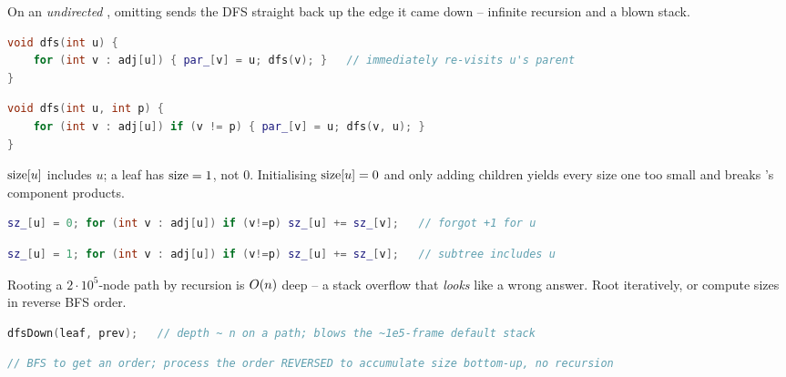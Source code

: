 \begin{warningbox}
On an \emph{undirected} , omitting  sends the DFS
straight back up the edge it came down -- infinite recursion and a blown stack.
\end{warningbox}
\begin{lstlisting}[caption={\textcolor{warningred}{WRONG}: walks back to the parent}, language=C++, basicstyle=\ttfamily\small]
void dfs(int u) {
    for (int v : adj[u]) { par_[v] = u; dfs(v); }   // immediately re-visits u's parent
}
\end{lstlisting}
\begin{lstlisting}[caption={\textcolor{successgreen}{RIGHT}: skip the node we came from}, language=C++, basicstyle=\ttfamily\small]
void dfs(int u, int p) {
    for (int v : adj[u]) if (v != p) { par_[v] = u; dfs(v, u); }
}
\end{lstlisting}

\begin{warningbox}
$\operatorname{size}[u]$ includes $u$; a leaf has $\operatorname{size}=1$, not $0$. Initialising $\operatorname{size}[u]=0$ and only
adding children yields every size one too small and breaks 's
component products.
\end{warningbox}
\begin{lstlisting}[caption={\textcolor{warningred}{WRONG}: leaf size 0, all sizes off by one}, language=C++, basicstyle=\ttfamily\small]
sz_[u] = 0; for (int v : adj[u]) if (v!=p) sz_[u] += sz_[v];   // forgot +1 for u
\end{lstlisting}
\begin{lstlisting}[caption={\textcolor{successgreen}{RIGHT}: start at 1 (count yourself)}, language=C++, basicstyle=\ttfamily\small]
sz_[u] = 1; for (int v : adj[u]) if (v!=p) sz_[u] += sz_[v];   // subtree includes u
\end{lstlisting}

\begin{warningbox}
Rooting a $2\cdot10^5$-node path by recursion is $O(n)$ deep -- a stack overflow that
\emph{looks} like a wrong answer. Root iteratively, or compute sizes in reverse BFS order.
\end{warningbox}
\begin{lstlisting}[caption={\textcolor{warningred}{WRONG}: recursion on a chain -> RE}, language=C++, basicstyle=\ttfamily\small]
dfsDown(leaf, prev);   // depth ~ n on a path; blows the ~1e5-frame default stack
\end{lstlisting}
\begin{lstlisting}[caption={\textcolor{successgreen}{RIGHT}: explicit stack, or BFS order then reverse}, language=C++, basicstyle=\ttfamily\small]
// BFS to get an order; process the order REVERSED to accumulate size bottom-up, no recursion
\end{lstlisting}

